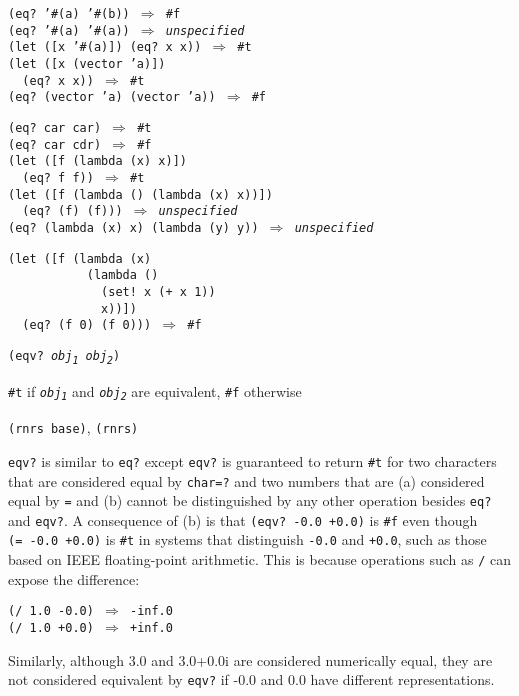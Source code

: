 \begin{alltt}
(eq? '\#{}(a) '\#{}(b)) \(\Rightarrow\) \#{}f
(eq? '\#{}(a) '\#{}(a)) \(\Rightarrow\) \textit{unspecified}
(let ([x '\#{}(a)]) (eq? x x)) \(\Rightarrow\) \#{}t
(let ([x (vector 'a)])
  (eq? x x)) \(\Rightarrow\) \#{}t
(eq? (vector 'a) (vector 'a)) \(\Rightarrow\) \#{}f

(eq? car car) \(\Rightarrow\) \#{}t
(eq? car cdr) \(\Rightarrow\) \#{}f
(let ([f (lambda (x) x)])
  (eq? f f)) \(\Rightarrow\) \#{}t
(let ([f (lambda () (lambda (x) x))])
  (eq? (f) (f))) \(\Rightarrow\) \textit{unspecified}
(eq? (lambda (x) x) (lambda (y) y)) \(\Rightarrow\) \textit{unspecified}

(let ([f (lambda (x)
           (lambda ()
             (set! x (+ x 1))
             x))])
  (eq? (f 0) (f 0))) \(\Rightarrow\) \#{}f
\end{alltt}

\begin{description}

\label{objects_s12}\item[procedure] \texttt{(eqv? \textit{obj\textsubscript{1}} \textit{obj\textsubscript{2}})}



\item[returns] \texttt{\#{}t} if \texttt{\textit{obj\textsubscript{1}}} and \texttt{\textit{obj\textsubscript{2}}} are equivalent, \texttt{\#{}f} otherwise


\item[libraries] \texttt{(rnrs base)}, \texttt{(rnrs)}
\end{description}

\texttt{eqv?} is similar to \texttt{eq?} except \texttt{eqv?}
is guaranteed to return \texttt{\#{}t} for two characters that are considered
equal by \texttt{char=?} and two numbers that are (a) considered
equal by \texttt{=} and (b) cannot be distinguished by any other
operation besides \texttt{eq?} and \texttt{eqv?}.
A consequence of (b) is that \texttt{(eqv? -0.0 +0.0)} is \texttt{\#{}f} even
though \texttt{(= -0.0 +0.0)} is \texttt{\#{}t} in systems that distinguish
\texttt{-0.0} and \texttt{+0.0}, such as those based on IEEE floating-point
arithmetic.
This is because operations such as \texttt{/} can expose the difference:

\begin{alltt}
(/ 1.0 -0.0) \(\Rightarrow\) -inf.0
(/ 1.0 +0.0) \(\Rightarrow\) +inf.0
\end{alltt}


Similarly, although 3.0 and 3.0+0.0i are considered numerically equal,
they are not considered equivalent by \texttt{eqv?} if -0.0 and
0.0 have different representations.


